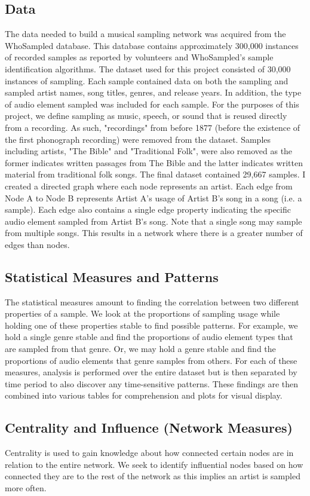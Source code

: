 \documentclass[pageno]{jpaper}
\begin{document}
\subsection{Data}
The data needed to build a musical sampling network was acquired from the WhoSampled database. \cite{WhoSampled} This database contains approximately 300,000 instances of recorded samples as reported by volunteers and WhoSampled's sample identification algorithms. The dataset used for this project consisted of 30,000 instances of sampling. Each sample contained data on both the sampling and sampled artist names, song titles, genres, and release years. In addition, the type of audio element sampled was included for each sample. For the purposes of this project, we define sampling as music, speech, or sound that is reused directly from a recording. As such, "recordings" from before 1877 (before the existence of the first phonograph recording) were removed from the dataset. Samples including artists, "The Bible" and "Traditional Folk", were also removed as the former indicates written passages from The Bible and the latter indicates written material from traditional folk songs. The final dataset contained 29,667 samples. I created a directed graph where each node represents an artist. Each edge from Node A to Node B represents Artist A's usage of Artist B's song in a song (i.e. a sample). Each edge also contains a single edge property indicating the specific audio element sampled from Artist B's song. Note that a single song may sample from multiple songs. This results in a network where there is a greater number of edges than nodes.
\subsection{Statistical Measures and Patterns}
The statistical measures amount to finding the correlation between two different properties of a sample. We look at the proportions of sampling usage while holding one of these properties stable to find possible patterns. For example, we hold a single genre stable and find the proportions of audio element types that are sampled from that genre. Or, we may hold a genre stable and find the proportions of audio elements that genre samples from others. For each of these measures, analysis is performed over the entire dataset but is then separated by time period to also discover any time-sensitive patterns. These findings are then combined into various tables for comprehension and plots for visual display. 
\subsection{Centrality and Influence (Network Measures)}
Centrality is used to gain knowledge about how connected certain nodes are in relation to the entire network. We seek to identify influential nodes based on how connected they are to the rest of the network as this implies an artist is sampled more often. 
\end{document}
